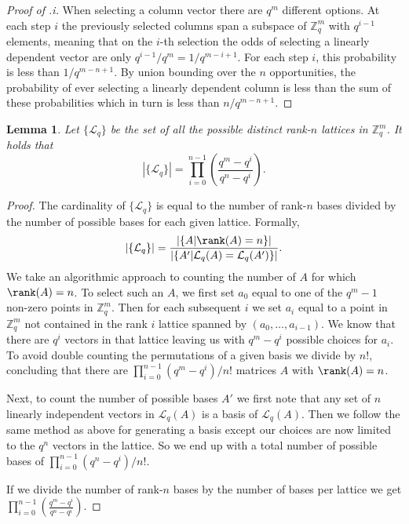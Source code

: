 \documentclass[11pt]{article}
\theoremstyle{definition}
\theoremstyle{plain}
\newtheorem{lemma}[definition]{Lemma}
\theoremstyle{remark}
\newcommand{\LL}{\mathcal{L}}
\newcommand{\bZ}{\mathbb{Z}}
\begin{document}
\begin{proof}[Proof of .i]
When selecting a column vector there are $q^m$ different options. At each step $i$ the previously selected columns span a subspace of $\bZ_q^m$ with $q^{i-1}$ elements, meaning that on the $i$-th selection the odds of selecting a linearly dependent vector are only ${q^{i-1}}/{q^m} = {1}/{q^{m-i+1}}$. For each step $i$, this probability is less than ${1}/{q^{m-n+1}}$. By union bounding over the $n$ opportunities, the probability of ever selecting a linearly dependent column is less than the sum of these probabilities which in turn is less than ${n}/{q^{m-n+1}}$.
\end{proof}


\begin{lemma}\label{tec:lat-num}
Let $\{\LL_q\}$ be the set of all the possible distinct rank-$n$ lattices in $\bZ_q^m$. It holds that
\begin{equation*}
    |\{\LL_q\}| = \prod_{i=0}^{n-1}\left(\frac{q^m - q^i}{q^n - q^i}\right).
\end{equation*}
\end{lemma}
\begin{proof}
The cardinality of $\{\LL_q\}$ is equal to the number of rank-$n$ bases divided by the number of possible bases for each given lattice. Formally,
\[ |\{\LL_q\}| = \frac{|\{A| \rank(A) = n\}|}{|\{A' | \LL_q(A) = \LL_q(A')\}|}. \]
We take an algorithmic approach to counting the number of $A$ for which $\rank(A) = n$. To select such an $A$, we first set $a_0$ equal to one of the $q^m - 1$ non-zero points in $\mathbb{Z}_q^m$. Then for each subsequent $i$ we set $a_i$ equal to a point in $\mathbb{Z}_q^m$ not contained in the rank $i$ lattice spanned by $(a_0, \dots, a_{i-1})$. We know that there are $q^{i}$ vectors in that lattice leaving us with $q^m - q^{i}$ possible choices for $a_i$. To avoid double counting the permutations of a given basis we divide by $n!$, concluding that there are ${\prod_{i=0}^{n-1}\left(q^m - q^i\right)}/{n!}$ matrices $A$ with $\rank(A) = n$.

Next, to count the number of possible bases $A'$ we first note that any set of $n$ linearly independent vectors in $\LL_q(A)$ is a basis of $\LL_q(A)$. Then we follow the same method as above for generating a basis except our choices are now limited to the $q^n$ vectors in the lattice. So we end up with a total number of possible bases of ${\prod_{i=0}^{n-1}\left(q^n - q^i\right)}/{n!}$. 

If we divide the number of rank-$n$ bases by the number of bases per lattice we get $\prod_{i=0}^{n-1}\left(\frac{q^m - q^i}{q^n - q^i}\right)$.
\end{proof}
\end{document}
